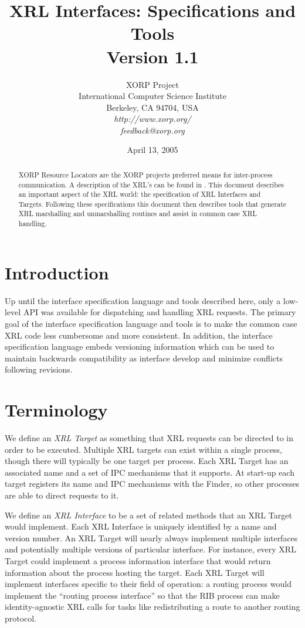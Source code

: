 \documentclass[11pt]{article}
\title{
XRL Interfaces: Specifications and Tools \\
\vspace{1ex} Version 1.1
}
\author{ XORP Project					\\
	 International Computer Science Institute	\\
	 Berkeley, CA 94704, USA			\\
         {\it http://www.xorp.org/}			\\
	 {\it feedback@xorp.org}
}
\date{April 13, 2005}
\begin{document}
\maketitle

\begin{abstract}
XORP Resource Locators are the XORP projects preferred means for
inter-process communication.  A description of the XRL's can be found
in \cite{xorp:xrl}.  This document describes an important aspect of the XRL
world: the specification of XRL Interfaces and Targets.  Following
these specifications this document then describes tools that generate
XRL marshalling and unmarshalling routines and assist in common case
XRL handling.
\end{abstract}

\section{Introduction}

Up until the interface specification language and tools described
here, only a low-level API was available for dispatching and handling
XRL requests.  The primary goal of the interface specification
language and tools is to make the common case XRL code less cumbersome
and more consistent.  In addition, the interface specification
language embeds versioning information which can be used to maintain
backwards compatibility as interface develop and minimize conflicts
following revisions.

\section{Terminology}

We define an \emph{XRL Target} as something that XRL requests can be
directed to in order to be executed.  Multiple XRL targets can
exist within a single process, though there will typically be one
target per process.  Each XRL Target has an associated name and a set
of IPC mechanisms that it supports.  At start-up each target registers
its name and IPC mechanisms with the Finder, so other processes are
able to direct requests to it.

We define an \emph{XRL Interface} to be a set of related methods that
an XRL Target would implement.  Each XRL Interface is uniquely
identified by a name and version number.  An XRL Target will nearly
always implement multiple interfaces and potentially multiple versions
of particular interface.  For instance, every XRL Target could
implement a process information interface that would return
information about the process hosting the target.  Each XRL Target
will implement interfaces specific to their field of operation: a
routing process would implement the ``routing process interface'' so
that the RIB process can make identity-agnostic XRL calls for tasks
like redistributing a route to another routing protocol.
\end{document}
